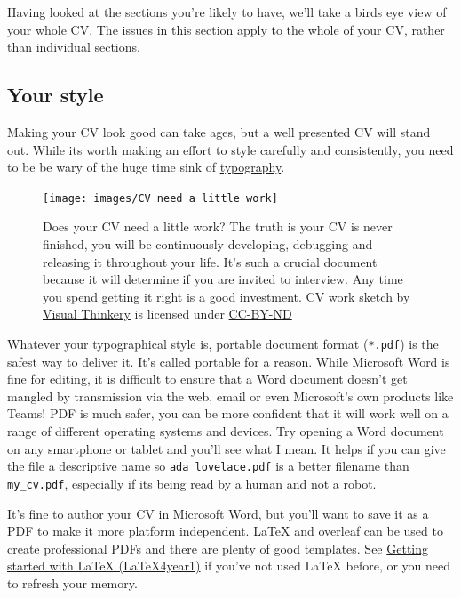 \documentclass[
]{book}
\begin{document}
Having looked at the sections you're likely to have, we'll take a birds eye view of your whole CV. The issues in this section apply to the whole of your CV, rather than individual sections.

\hypertarget{pdf}{%
\subsection{Your style}\label{pdf}}

Making your CV look good can take ages, but a well presented CV will stand out. While its worth making an effort to style carefully and consistently, you need to be be wary of the huge time sink of \href{https://en.wikipedia.org/wiki/Typography}{typography}.

\begin{figure}

{\centering \texttt{[image: images/CV need a little work]} 

}

\caption{Does your CV need a little work? The truth is your CV is never finished, you will be continuously developing, debugging and releasing it throughout your life. It's such a crucial document because it will determine if you are invited to interview. Any time you spend getting it right is a good investment. CV work sketch by \href{https://visualthinkery.com}{Visual Thinkery} is licensed under \href{https://creativecommons.org/licenses/by-nd/4.0/}{CC-BY-ND}}\label{fig:cvwork-fig}
\end{figure}



Whatever your typographical style is, portable document format (\texttt{*.pdf}) is the safest way to deliver it. It's called portable for a reason. While Microsoft Word is fine for editing, it is difficult to ensure that a Word document doesn't get mangled by transmission via the web, email or even Microsoft's own products like Teams! PDF is much safer, you can be more confident that it will work well on a range of different operating systems and devices. Try opening a Word document on any smartphone or tablet and you'll see what I mean. It helps if you can give the file a descriptive name so \texttt{ada\_lovelace.pdf} is a better filename than \texttt{my\_cv.pdf}, especially if its being read by a human and not a robot. 🤖

It's fine to author your CV in Microsoft Word, but you'll want to save it as a PDF to make it more platform independent. LaTeX and overleaf can be used to create professional PDFs and there are plenty of good templates. See \href{https://latex4year1.netlify.app/}{Getting started with LaTeX (LaTeX4year1)} if you've not used LaTeX before, or you need to refresh your memory. \citep{latex4year1}
\end{document}
